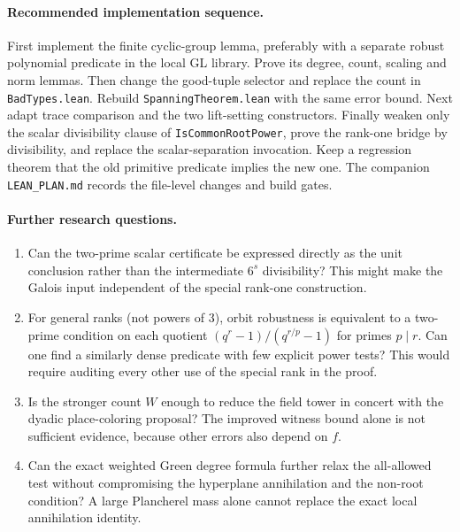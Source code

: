 \documentclass[11pt]{article}
\theoremstyle{definition}\newtheorem{definition}[theorem]{Definition}
\begin{document}
\paragraph{Recommended implementation sequence.}
First implement the finite cyclic-group lemma, preferably with a separate robust polynomial predicate in the local GL library. Prove its degree, count, scaling and norm lemmas. Then change the good-tuple selector and replace the count in \texttt{BadTypes.lean}. Rebuild \texttt{SpanningTheorem.lean} with the same error bound. Next adapt trace comparison and the two lift-setting constructors. Finally weaken only the scalar divisibility clause of \texttt{IsCommonRootPower}, prove the rank-one bridge by divisibility, and replace the scalar-separation invocation. Keep a regression theorem that the old primitive predicate implies the new one. The companion \texttt{LEAN\_PLAN.md} records the file-level changes and build gates.

\paragraph{Further research questions.}
\begin{enumerate}
\item Can the two-prime scalar certificate be expressed directly as the unit conclusion rather than the intermediate $6^s$ divisibility? This might make the Galois input independent of the special rank-one construction.
\item For general ranks (not powers of $3$), orbit robustness is equivalent to a two-prime condition on each quotient $(q^r-1)/(q^{r/p}-1)$ for primes $p\mid r$. Can one find a similarly dense predicate with few explicit power tests? This would require auditing every other use of the special rank in the proof.
\item Is the stronger count $W$ enough to reduce the field tower in concert with the dyadic place-coloring proposal? The improved witness bound alone is not sufficient evidence, because other errors also depend on $f$.
\item Can the exact weighted Green degree formula further relax the all-allowed test without compromising the hyperplane annihilation and the non-root condition? A large Plancherel mass alone cannot replace the exact local annihilation identity.
\end{enumerate}
\end{document}
